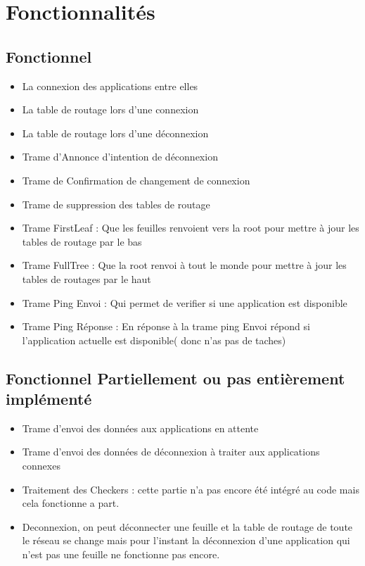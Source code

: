 \documentclass[a4paper,titlepage]{report}
\begin{document}
\pagebreak
\section{Fonctionnalités}
\subsection{Fonctionnel}
\begin{itemize}
\item La connexion des applications entre elles
\item La table de routage lors d'une connexion
\item La table de routage lors d'une déconnexion
\item Trame d'Annonce d'intention de déconnexion
\item Trame de Confirmation de changement de connexion
\item Trame de suppression des tables de routage
\item Trame FirstLeaf : Que les feuilles renvoient vers la root pour mettre à jour les tables de routage par le bas
\item Trame FullTree : Que la root renvoi à tout le monde pour mettre à jour les tables de routages par le haut
\item Trame Ping Envoi : Qui permet de verifier si une application est disponible
\item Trame Ping Réponse : En réponse à la trame ping Envoi répond si l'application actuelle est disponible( donc n'as pas de taches)
\end{itemize}

\subsection{Fonctionnel Partiellement ou pas entièrement implémenté}
\begin{itemize}
\item Trame  d'envoi des données aux applications en attente
\item Trame d'envoi des données de déconnexion à traiter aux applications connexes
\item Traitement des Checkers : cette partie n'a pas encore été intégré au code mais cela fonctionne a part.
\item Deconnexion, on peut déconnecter une feuille et la table de routage de toute le réseau se change mais pour l'instant la déconnexion d'une application qui n'est pas une feuille ne fonctionne pas encore.
\end{itemize}
\end{document}
